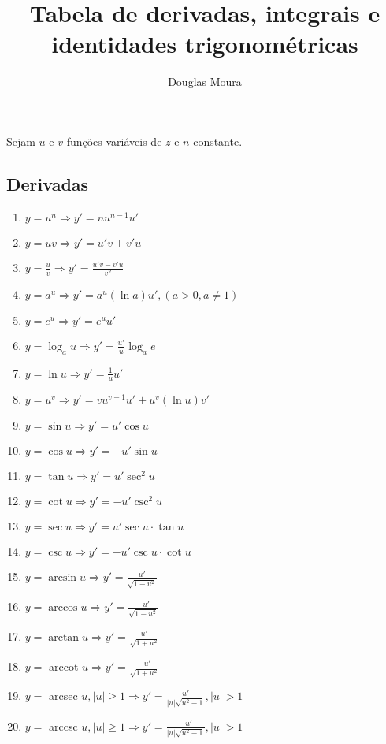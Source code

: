 \documentclass{article}
\title{Tabela de derivadas, integrais e identidades trigonométricas}
\author{ Douglas Moura }
\author{}
\begin{document}

  \centering
    Sejam \(u\) e \(v\) funções variáveis de \(z\) e \(n\) constante.

  \justify
  \begin{multicols}{2}

    \section{Derivadas}

      \begin{enumerate}
        \item \( y = u^n \Rightarrow y' = n  u^{n-1}  u' \)
        \item \( y = u  v \Rightarrow y' = u'  v + v'  u \)
        \item \( y = \frac{u}{v} \Rightarrow y' = \frac{u'  v - v'  u}{v^2} \)
        \item \( y = a^u \Rightarrow y' = a^u  (\ln a)  u', (a > 0, a \neq 1 ) \)
        \item \( y = e^u \Rightarrow y' = e^u  u' \)
        \item \( y = \log_a{u} \Rightarrow y' = \frac{u'}{u}  \log_a  e \)
        \item \( y = \ln{u} \Rightarrow y' = \frac{1}{u}  u' \)
        \item \( y = u^v \Rightarrow y' = v  u^{v-1}  u' + u^v (\ln u) v' \)
        \item \( y = \sin{u} \Rightarrow y' = u' \cos{u} \)
        \item \( y = \cos{u} \Rightarrow y' = -u' \sin{u} \)
        \item \( y = \tan{u} \Rightarrow y' = u' \sec^2{u} \)
        \item \( y = \cot{u} \Rightarrow y' = -u' \csc^2{u} \)
        \item \( y = \sec{u} \Rightarrow y' = u' \sec{u} \cdot \tan{u} \)
        \item \( y = \csc{u} \Rightarrow y' = -u' \csc{u} \cdot \cot{u} \)
        \item \( y = \arcsin{u} \Rightarrow y' = \frac{u'}{\sqrt{1-u^2}} \)
        \item \( y = \arccos{u} \Rightarrow y' = \frac{-u'}{\sqrt{1-u^2}} \)
        \item \( y = \arctan{u} \Rightarrow y' = \frac{u'}{\sqrt{1+u^2}} \)
        \item \( y = \) arccot \( u \Rightarrow y' = \frac{-u'}{\sqrt{1+u^2}} \)
        \item \( y = \) arcsec \(u, |u| \geq 1 \Rightarrow y' = \frac{u'}{|u|         \sqrt{u^2-1}}, |u| > 1 \)
        \item \( y = \) arccsc \(u, |u| \geq 1 \Rightarrow y' = \frac{-u'}{|u| \sqrt{u^2-1}}, |u| > 1 \)
      \end{enumerate}


\end{multicols}
\end{document}
